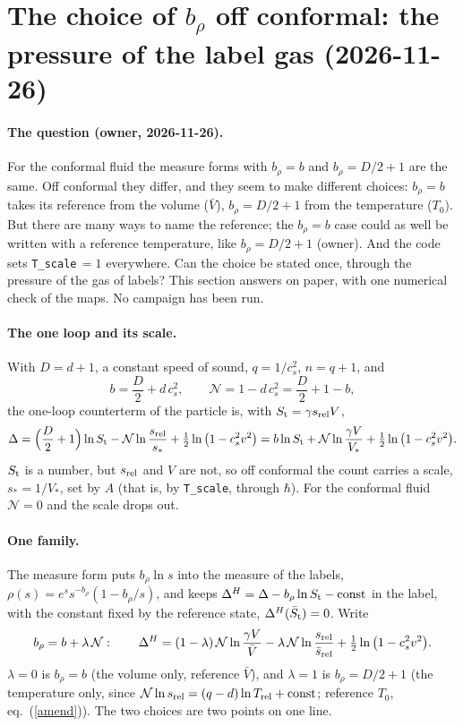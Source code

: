 \documentclass[11pt,aps,preprint,nofootinbib,superscriptaddress,tightenlines]{revtex4-2}
\def\st{\begin{equation}}
\def\stp{\end{equation}}
\def\Eq#1{eq.~(\ref{#1})}
\let\oldparagraph\paragraph
\renewcommand{\paragraph}{\par\bigskip\oldparagraph}
\begin{document}
\section{The choice of \texorpdfstring{$b_\rho$}{b_rho} off conformal: the pressure of the label gas (2026-11-26)}
\label{sec:beta}

\paragraph{The question (owner, 2026-11-26).}  For the conformal fluid the measure forms with $b_\rho=b$ and $b_\rho=D/2+1$ are the same.  Off
conformal they differ, and they seem to make different choices: $b_\rho=b$ takes its reference from the volume ($\bar V$), $b_\rho=D/2+1$ from the
temperature ($T_0$).  But there are many ways to name the reference; the $b_\rho=b$ case could as well be written with a reference temperature, like
$b_\rho=D/2+1$ (owner).  And the code sets \texttt{T\_scale}$\,=1$ everywhere.  Can the choice be stated once, through the pressure of the gas of
labels?  This section answers on paper, with one numerical check of the maps.  No campaign has been run.

\paragraph{The one loop and its scale.}  With $D=d+1$, a constant speed of sound, $q=1/c_s^2$, $n=q+1$, and
\st
b=\frac D2+d\,c_s^2,\qquad \mathcal N=1-d\,c_s^2=\frac D2+1-b,
\stp
the one-loop counterterm of the particle is, with $S_{\rm t}=\gamma s_{\rm rel}V$,
\st
\Delta=\Big(\frac D2+1\Big)\ln S_{\rm t}-\mathcal N\ln\frac{s_{\rm rel}}{s_*}+\tfrac12\ln\big(1-c_s^2v^2\big)
=b\ln S_{\rm t}+\mathcal N\ln\frac{\gamma V}{V_*}+\tfrac12\ln\big(1-c_s^2v^2\big) .
\label{deltascale}
\stp
$S_{\rm t}$ is a number, but $s_{\rm rel}$ and $V$ are not, so off conformal the count carries a scale, $s_*=1/V_*$, set by $A$ (that is, by
\texttt{T\_scale}, through $\hbar$).  For the conformal fluid $\mathcal N=0$ and the scale drops out.

\paragraph{One family.}  The measure form puts $b_\rho\ln s$ into the measure of the labels, $\rho(s)=e^s s^{-b_\rho}(1-b_\rho/s)$, and keeps
$\Delta^H=\Delta-b_\rho\ln S_{\rm t}-{\rm const}$ in the label, with the constant fixed by the reference state, $\Delta^H(\bar S_{\rm t})=0$.  Write
\st
b_\rho=b+\lambda\,\mathcal N:\qquad
\Delta^H=(1-\lambda)\,\mathcal N\ln\frac{\gamma V}{\bar V}-\lambda\,\mathcal N\ln\frac{s_{\rm rel}}{\bar s_{\rm rel}}+\tfrac12\ln\big(1-c_s^2v^2\big) .
\label{betafamily}
\stp
$\lambda=0$ is $b_\rho=b$ (the volume only, reference $\bar V$), and $\lambda=1$ is $b_\rho=D/2+1$ (the temperature only, since
$\mathcal N\ln s_{\rm rel}=(q-d)\ln T_{\rm rel}+{\rm const}$; reference $T_0$, \Eq{amend}).  The two choices are two points on one line.
\end{document}
